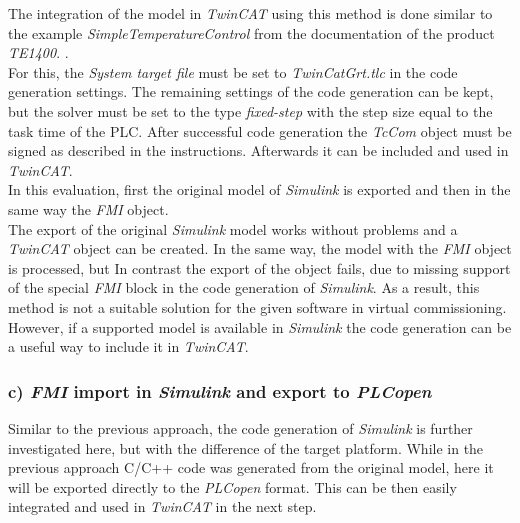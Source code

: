    The integration of the model in \textit{TwinCAT} using this method is done similar to the example \textit{SimpleTemperatureControl} from the documentation of the product \textit{TE1400}. \cite{TwincatTcComSamples}. \\
    For this, the \textit{System target file} must be set to \textit{TwinCatGrt.tlc} in the code generation settings. The remaining settings of the code generation can be kept, but the solver must be set to the type \textit{fixed-step} with the step size equal to the task time of the PLC. After successful code generation the \textit{TcCom} object must be signed as described in the instructions. Afterwards it can be included and used in \textit{TwinCAT}.\\
    In this evaluation, first the original model of \textit{Simulink} is exported and then in the same way the \textit{FMI} object.\\
    
    The export of the original \textit{Simulink} model works without problems and a \textit{TwinCAT} object can be created. In the same way, the model with the \textit{FMI} object is processed, but In contrast the export of the object fails, due to missing support of the special \textit{FMI} block in the code generation of \textit{Simulink}. As a result, this method is not a suitable solution for the given software in virtual commissioning. However, if a supported model is available in \textit{Simulink} the code generation can be a useful way to include it in \textit{TwinCAT}.  
    
    

\subsubsection{c) \textit{FMI} import in \textit{Simulink} and export to \textit{PLCopen}}
    Similar to the previous approach, the code generation of \textit{Simulink} is further investigated here, but with the difference of the target platform. While in the previous approach C/C++ code was generated from the original model, here it will be exported directly to the \textit{PLCopen} format. This can be then easily integrated and used in \textit{TwinCAT} in the next step.\\
    
